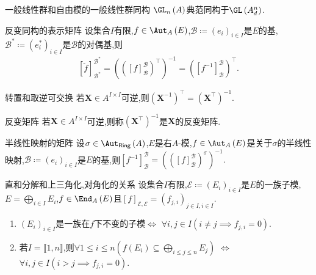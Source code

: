 \begin{corollary}{一般线性群和自由模的一般线性群同构}{}
	$\GL_{n}\left(A\right)$典范同构于$\GL\left(A_{d}^{n}\right)$.
\end{corollary}

\begin{proposition}{反变同构的表示矩阵}{}
	设集合$I$有限,$f\in\Aut_{A}\left(E\right)$,$\mathcal{B}\coloneq\left(e_{i}\right)_{i\in I}$是$E$的基,$\mathcal{B}^{\ast}\coloneq\left(e_{i}^{\ast}\right)_{i\in I}$是$\mathcal{B}$的对偶基,则
	\begin{align*}
		\left[\check{f}\right]_{\mathcal{B}^{\ast}}^{\mathcal{B}^{\ast}}=\left(\left(\left[f\right]_{\mathcal{B}}^{\mathcal{B}}\right)^{\top}\right)^{-1}=\left(\left[f^{-1}\right]_{\mathcal{B}}^{\mathcal{B}}\right)^{\top}.
	\end{align*}
\end{proposition}

\begin{corollary}{转置和取逆可交换}{}
	若$\boldsymbol{X}\in A^{I\times I}$可逆,则$\left(\boldsymbol{X}^{-1}\right)^{\top}=\left(\boldsymbol{X}^{\top}\right)^{-1}$.
\end{corollary}

\begin{definition}{反变矩阵}{}
	若$\boldsymbol{X}\in A^{I\times I}$可逆,则称$\left(\boldsymbol{X}^{\top}\right)^{-1}$是$\boldsymbol{X}$的反变矩阵.
\end{definition}

\begin{proposition}{半线性映射的矩阵}{}
	设$\sigma\in\Aut_{\mathsf{Ring}}\left(A\right)$,$E$是右$A$-模,$f\in\Aut_{A}\left(E\right)$是关于$\sigma$的半线性映射,$\mathcal{B}\coloneq\left(e_{i}\right)_{i\in I}$是$E$的基,则$\left[f^{-1}\right]_{\mathcal{B}}^{\mathcal{B}}=\left(\left(\left[f\right]_{\mathcal{B}}^{\mathcal{B}}\right)^{\sigma}\right)^{-1}.$
\end{proposition}

\begin{proposition}{直和分解和上三角化,对角化的关系}{}
	设集合$I$有限,$\mathcal{E}\coloneq\left(E_{i}\right)_{i\in I}$是$E$的一族子模,$E=\bigoplus\limits_{i\in I}E_{i}$,$f\in\End_{A}\left(E\right)$且$\left[f\right]_{\mathcal{E},\mathcal{E}}=\left(f_{j,i}\right)_{j\in I,i\in I}$.
	\begin{enumerate}
		\item $\left(E_{i}\right)_{i\in I}$是一族在$f$下不变的子模$\iff$ $\forall i,j\in I\left(i\neq j\implies f_{j,i}=0\right)$.
		\item 若$I=\llbracket 1,n\rrbracket$,则$\forall 1\leq i\leq n\left(f\left(E_{i}\right)\subseteq\bigoplus\limits_{i\leq j\leq n}E_{j}\right)$ $\iff$ $\forall i,j\in I\left(i>j\implies f_{j,i}=0\right)$.
	\end{enumerate}
\end{proposition}

